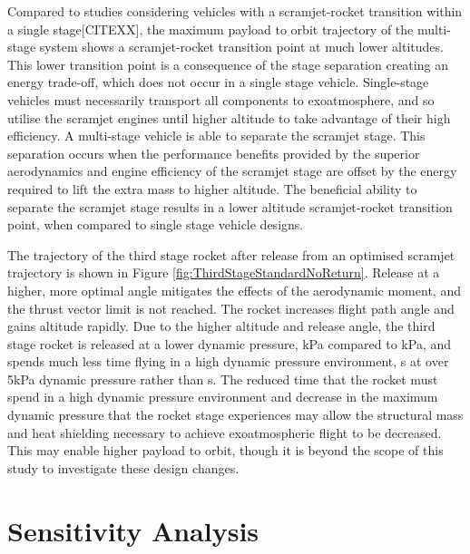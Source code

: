Compared to studies considering vehicles with a scramjet-rocket transition within a single stage\cite{Lu1993,Trefny1999}[CITEXX], the maximum payload to orbit trajectory of the multi-stage system shows a scramjet-rocket transition point at much lower altitudes.
This lower transition point is a consequence of the stage separation creating an energy trade-off, which does not occur in a single stage vehicle. Single-stage vehicles must necessarily transport all components to exoatmosphere, and so utilise the scramjet engines until higher altitude to take advantage of their high efficiency. A multi-stage vehicle is able to separate the scramjet stage. 
This separation occurs when the performance benefits provided by the superior aerodynamics and engine efficiency of the scramjet stage are offset by the energy required to lift the extra mass to higher altitude. The beneficial ability
to separate the scramjet stage results in a lower altitude scramjet-rocket transition point, when compared to single
stage vehicle designs.






The trajectory of the third stage rocket after release from an optimised scramjet trajectory is shown in Figure \ref{fig:ThirdStageStandardNoReturn}. Release at a higher, more optimal angle mitigates the effects of the aerodynamic moment, and the thrust vector limit is not reached. The rocket increases flight path angle and gains altitude rapidly.
Due to the higher altitude and release angle, the third stage rocket is released at a lower dynamic pressure, \secondthirdSeparationqCdStandardNoReturn kPa compared to \secondthirdSeparationqConstq kPa, and spends much less time flying in a high dynamic pressure environment, \thirdqOverFiveStandard s at over 5kPa dynamic pressure rather than \thirdqOverFiveConstq s. 
The reduced time that the rocket must spend in a high dynamic pressure environment and decrease in the maximum dynamic pressure that the rocket stage experiences may allow the structural mass and heat shielding necessary to achieve exoatmospheric flight to be decreased. This may enable higher payload to orbit, though it is beyond the scope of this study to investigate these design changes. 

\section{Sensitivity Analysis}\label{sec:sensitivityNoReturn}

